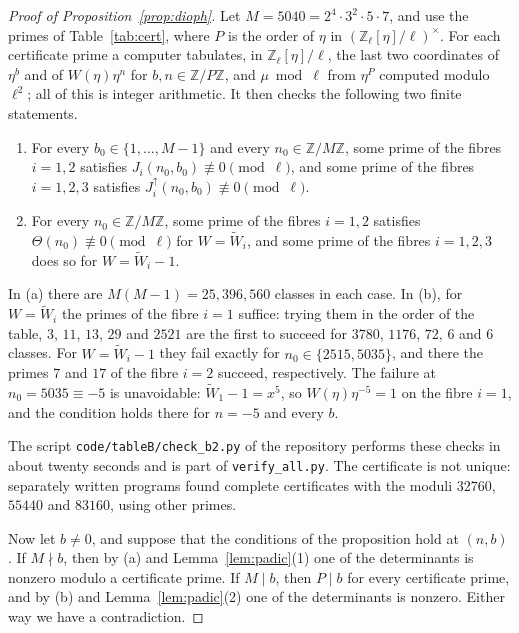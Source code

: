 \documentclass[11pt]{amsart}
\theoremstyle{definition}
\newcommand{\lean}[1]{\texttt{#1}}
\newcommand{\Z}{\mathbb{Z}}
\begin{document}
\begin{proof}[Proof of Proposition~\ref{prop:dioph}]
Let $M=5040=2^4\cdot3^2\cdot5\cdot7$, and use the primes of Table~\ref{tab:cert}, where $P$ is the order of $\eta$ in $(\Z_\ell[\eta]/\ell)^\times$. For each certificate prime a computer tabulates, in $\Z_\ell[\eta]/\ell$, the last two coordinates of $\eta^b$ and of $W(\eta)\eta^n$ for $b,n\in\Z/P\Z$, and $\mu\bmod\ell$ from $\eta^P$ computed modulo $\ell^2$; all of this is integer arithmetic. It then checks the following two finite statements.
\begin{enumerate}
\item[(a)] For every $b_0\in\{1,\dots,M-1\}$ and every $n_0\in\Z/M\Z$, some prime of the fibres $i=1,2$ satisfies $J_i(n_0,b_0)\not\equiv0\pmod\ell$, and some prime of the fibres $i=1,2,3$ satisfies $J^{\uparrow}_i(n_0,b_0)\not\equiv0\pmod\ell$.
\item[(b)] For every $n_0\in\Z/M\Z$, some prime of the fibres $i=1,2$ satisfies $\Theta(n_0)\not\equiv0\pmod\ell$ for $W=\tilde W_i$, and some prime of the fibres $i=1,2,3$ does so for $W=\tilde W_i-1$.
\end{enumerate}
In (a) there are $M(M-1)=25{,}396{,}560$ classes in each case. In (b), for $W=\tilde W_i$ the primes of the fibre $i=1$ suffice: trying them in the order of the table, $3$, $11$, $13$, $29$ and $2521$ are the first to succeed for $3780$, $1176$, $72$, $6$ and $6$ classes. For $W=\tilde W_i-1$ they fail exactly for $n_0\in\{2515,5035\}$, and there the primes $7$ and $17$ of the fibre $i=2$ succeed, respectively. The failure at $n_0=5035\equiv-5$ is unavoidable: $\tilde W_1-1=x^5$, so $W(\eta)\eta^{-5}=1$ on the fibre $i=1$, and the condition holds there for $n=-5$ and every $b$.

The script \lean{code/tableB/check\_b2.py} of the repository performs these checks in about twenty seconds and is part of \lean{verify\_all.py}. The certificate is not unique: separately written programs found complete certificates with the moduli $32760$, $55440$ and $83160$, using other primes.

Now let $b\ne0$, and suppose that the conditions of the proposition hold at $(n,b)$. If $M\nmid b$, then by (a) and Lemma~\ref{lem:padic}(1) one of the determinants is nonzero modulo a certificate prime. If $M\mid b$, then $P\mid b$ for every certificate prime, and by (b) and Lemma~\ref{lem:padic}(2) one of the determinants is nonzero. Either way we have a contradiction.
\end{proof}
\end{document}
